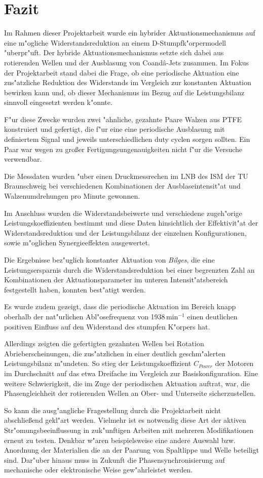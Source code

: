 \chapter{Fazit}\label{s:fazit}
Im Rahmen dieser Projektarbeit wurde ein hybrider Aktuationsmechanismus auf eine m"ogliche Widerstandsreduktion an einem D-Stumpfk"orpermodell "uberpr"uft.
Der hybride Aktuationsmechanismus setzte sich dabei aus rotierenden Wellen und der Ausblasung von Coand\^{a}-Jets zusammen.
Im Fokus der Projektarbeit stand dabei die Frage, ob eine periodische Aktuation eine zus"atzliche Reduktion des Widerstands im Vergleich zur konstanten Aktuation bewirken kann und, ob dieser Mechanismus im Bezug auf die Leistungsbilanz sinnvoll eingesetzt werden k"onnte.

F"ur diese Zwecke wurden zwei "ahnliche, gezahnte Paare Walzen aus PTFE konstruiert und gefertigt, die f"ur eine eine periodische Ausblasung mit definiertem Signal und jeweils unterschiedlichen duty cyclen sorgen sollten. Ein Paar war wegen zu gro\ss{}er Fertigungsungenauigkeiten nicht f"ur die Versuche verwendbar.

Die Messdaten wurden "uber einen Druckmessrechen im LNB des ISM der TU Braunschweig bei verschiedenen Kombinationen der Ausblaseintensit"at und Walzenumdrehungen pro Minute gewonnen.

Im Anschluss wurden die Widerstandsbeiwerte  und verschiedene zugeh"orige Leistungskoeffizienten bestimmt und diese Daten hinsichtlich der Effektivit"at der Widerstandsreduktion und der Leistungsbilanz der einzelnen Konfigurationen, sowie m"oglichen Synergieeffekten ausgewertet.

Die Ergebnisse bez"uglich konstanter Aktuation von \textit{Bilges}, die eine Leistungsersparnis durch die Widerstandsreduktion bei einer begrenzten Zahl an Kombinationen der Aktuationsparameter im unteren Intensit"atsbereich festgestellt haben, konnten best"atigt werden. 

Es wurde zudem gezeigt, dass die periodische Aktuation im Bereich knapp oberhalb der nat"urlichen Abl"osefrequenz von 1938\,$\mathrm{min^{-1}}$ einen deutlichen positiven Einfluss auf den Widerstand des stumpfen K"orpers hat.

Allerdings zeigten die gefertigten gezahnten Wellen bei Rotation Abrieberscheinungen, die zus"atzlichen in einer deutlich geschm"alerten  Leistungsbilanz m"undeten.
So stieg der Leistungskoeffizient $C_{Power}$ der Motoren  im Durchschnitt auf das etwa Dreifache im Vergleich zur Basiskonfiguration.
Eine weitere Schwierigkeit, die im Zuge der periodischen Aktuation auftrat, war, die Phasengleichheit der rotierenden Wellen an Ober- und Unterseite sicherzustellen.

So kann die ausg"angliche Fragestellung durch die Projektarbeit nicht abschlie\ss{}end gekl"art werden. Vielmehr ist es notwendig diese Art der aktiven Str"omungsbeeinflussung in zuk"unftigen Arbeiten mit mehreren Modifikationen erneut zu testen. Denkbar w"aren beispielsweise eine andere Auswahl bzw. Anordnung der  Materialien die an der Paarung von Spaltlippe und Welle beteiligt sind. Dar"uber hinaus muss in Zukunft die Phasensynchronisierung auf mechanische oder elektronische Weise gew"ahrleistet werden.